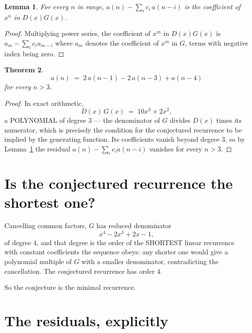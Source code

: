 \documentclass[11pt,a4paper]{article}
\theoremstyle{plain}
\newtheorem{theorem}{Theorem}
\newtheorem{lemma}[theorem]{Lemma}
\theoremstyle{definition}
\begin{document}
\begin{lemma}\label{lem:key}
For every $n$ in range, $a(n)-\sum_i c_i\,a(n-i)$ is the coefficient of $x^{n}$ in
$D(x)G(x)$.
\end{lemma}

\begin{proof}
Multiplying power series, the coefficient of $x^{m}$ in $D(x)G(x)$ is
$a_m-\sum_i c_i a_{m-i}$ where $a_m$ denotes the coefficient of $x^{m}$ in $G$, terms with
negative index being zero.
\end{proof}

\begin{theorem}
\[
a(n)\;=\;2\,a(n-1) - 2\,a(n-3) + a(n-4)
\]
for every $n>3$.
\end{theorem}

\begin{proof}
In exact arithmetic,
\[
D(x)\,G(x)\;=\;10 x^{3} + 2 x^{2},
\]
a POLYNOMIAL of degree $3$ --- the denominator of $G$ divides $D(x)$ times its numerator,
which is precisely the condition for the conjectured recurrence to be implied by the
generating function. Its coefficients vanish beyond degree $3$, so by
Lemma~\ref{lem:key} the residual $a(n)-\sum_ic_ia(n-i)$ vanishes for every
$n>3$.
\end{proof}

\section{Is the conjectured recurrence the shortest one?}

Cancelling common factors, $G$ has reduced denominator
\[
x^{4} - 2 x^{3} + 2 x - 1,
\]
of degree $4$, and that degree is the order of the SHORTEST linear recurrence with
constant coefficients the sequence obeys: any shorter one would give a polynomial multiple of
$G$ with a smaller denominator, contradicting the cancellation. The conjectured recurrence has
order $4$.

So the conjecture is the minimal recurrence.

\section{The residuals, explicitly}
\end{document}

